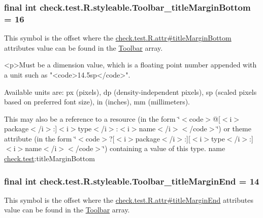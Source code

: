 \subsubsection[{Toolbar\+\_\+title\+Margin\+Bottom}]{\setlength{\rightskip}{0pt plus 5cm}final int check.\+test.\+R.\+styleable.\+Toolbar\+\_\+title\+Margin\+Bottom = 16\hspace{0.3cm}{\ttfamily [static]}}\label{classcheck_1_1test_1_1_r_1_1styleable_a5e6ae0606eec219fca6a04beab67b4b3}
This symbol is the offset where the \hyperlink{classcheck_1_1test_1_1_r_1_1attr_af0ece8636a362c616b298368dbfd014f}{check.\+test.\+R.\+attr\#title\+Margin\+Bottom} attribute\textquotesingle{}s value can be found in the \hyperlink{classcheck_1_1test_1_1_r_1_1styleable_a1a7fa90223693abef77e7484cca2df54}{Toolbar} array.

\begin{DoxyVerb}      <p>Must be a dimension value, which is a floating point number appended with a unit such as "<code>14.5sp</code>".
\end{DoxyVerb}
 Available units are\+: px (pixels), dp (density-\/independent pixels), sp (scaled pixels based on preferred font size), in (inches), mm (millimeters). 

This may also be a reference to a resource (in the form \char`\"{}$<$code$>$@\mbox{[}$<$i$>$package$<$/i$>$\+:\mbox{]}$<$i$>$type$<$/i$>$\+:$<$i$>$name$<$/i$>$$<$/code$>$\char`\"{}) or theme attribute (in the form \char`\"{}$<$code$>$?\mbox{[}$<$i$>$package$<$/i$>$\+:\mbox{]}\mbox{[}$<$i$>$type$<$/i$>$\+:\mbox{]}$<$i$>$name$<$/i$>$$<$/code$>$\char`\"{}) containing a value of this type.  name \hyperlink{namespacecheck_1_1test}{check.\+test}\+:title\+Margin\+Bottom \hypertarget{classcheck_1_1test_1_1_r_1_1styleable_a17f1cea527896f8c82a64142d730f2bc}{}
\subsubsection[{Toolbar\+\_\+title\+Margin\+End}]{\setlength{\rightskip}{0pt plus 5cm}final int check.\+test.\+R.\+styleable.\+Toolbar\+\_\+title\+Margin\+End = 14\hspace{0.3cm}{\ttfamily [static]}}\label{classcheck_1_1test_1_1_r_1_1styleable_a17f1cea527896f8c82a64142d730f2bc}
This symbol is the offset where the \hyperlink{classcheck_1_1test_1_1_r_1_1attr_ab9d5799591281efe884d17139689b1a0}{check.\+test.\+R.\+attr\#title\+Margin\+End} attribute\textquotesingle{}s value can be found in the \hyperlink{classcheck_1_1test_1_1_r_1_1styleable_a1a7fa90223693abef77e7484cca2df54}{Toolbar} array.

